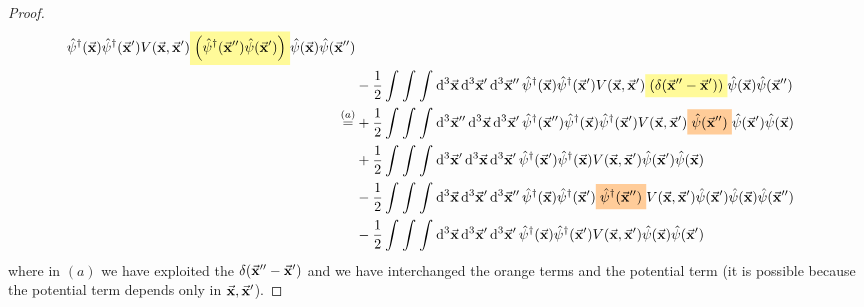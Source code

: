 \documentclass[11pt, a4paper, twoside, openright]{article}
\begin{document}
\begin{proof}
\begin{equation*}
\begin{split}
    \hat{\psi } ^\dag (\va{x})
    \hat{\psi } ^\dag (\va{x}') V (\va{x},\va{x}') \mathcolorbox{yellow!40}{ \qty(   \hat{\psi }^\dag (\va{x}'') \hat{\psi } (\va{x}')   )} \hat{\psi } (\va{x}) \hat{\psi }(\va{x}'') \\
    &-
    \frac{1}{2} \int_{}^{} \int_{}^{} \int_{}^{} \dd[3]{\va{x}} \dd[3]{\va{x}'} \dd[3]{\va{x}''}
    \hat{\psi } ^\dag (\va{x})
    \hat{\psi } ^\dag (\va{x}') V (\va{x},\va{x}') \mathcolorbox{yellow!40}{ \qty( \delta (\va{x}''-\va{x}')   )} \hat{\psi } (\va{x}) \hat{\psi }(\va{x}'') \\
    \overset{(a)}{=} &
     +\frac{1}{2} \int_{}^{} \int_{}^{} \int_{}^{} \dd[3]{\va{x}''} \dd[3]{\va{x}}  \dd[3]{\va{x}'}
    \hat{\psi }^\dag (\va{x}'')   \hat{\psi } ^\dag (\va{x})  \hat{\psi } ^\dag (\va{x}')  V (\va{x},\va{x}')  \mathcolorbox{orange!40}{ \hat{\psi }(\va{x}'') } \hat{\psi } (\va{x}') \hat{\psi } (\va{x}) \\
    &+
    \frac{1}{2} \int_{}^{} \int_{}^{} \int_{}^{} \dd[3]{\va{x}'} \dd[3]{\va{x}}  \dd[3]{\va{x}'}
    \hat{\psi }^\dag (\va{x}')   \hat{\psi } ^\dag (\va{x}) V (\va{x},\va{x}') \hat{\psi } (\va{x}') \hat{\psi } (\va{x})\\
    &-
    \frac{1}{2} \int_{}^{} \int_{}^{} \int_{}^{} \dd[3]{\va{x}} \dd[3]{\va{x}'} \dd[3]{\va{x}''}
    \hat{\psi } ^\dag (\va{x})
    \hat{\psi } ^\dag (\va{x}') \mathcolorbox{orange!40}{    \hat{\psi }^\dag (\va{x}'')    } V (\va{x},\va{x}')  \hat{\psi } (\va{x}') \hat{\psi } (\va{x}) \hat{\psi }(\va{x}'') \\
    &-
    \frac{1}{2} \int_{}^{} \int_{}^{} \int_{}^{} \dd[3]{\va{x}} \dd[3]{\va{x}'} \dd[3]{\va{x}'}
    \hat{\psi } ^\dag (\va{x})
    \hat{\psi } ^\dag (\va{x}') V (\va{x},\va{x}') \hat{\psi } (\va{x}) \hat{\psi }(\va{x}') \\
\end{split}
\end{equation*}
where in \( (a) \) we have exploited the \( \delta (\va{x}''-\va{x}') \) and we have interchanged the orange terms and the potential term (it is possible because the potential term depends only in \( \va{x},\va{x}' \)).



\end{proof}
\end{document}
